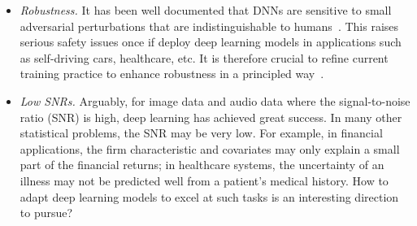 \begin{itemize}
\item{\emph{Robustness.} It has been well documented that DNNs are sensitive to small adversarial perturbations that are indistinguishable to humans~\citep{szegedy2013intriguing}. This raises serious safety issues once if deploy deep learning models in applications such as self-driving cars, healthcare, etc. It is therefore crucial  to refine current training practice to enhance robustness in a principled way~\citep{singh2018hierarchical}.  %
}


\item{\emph{Low SNRs.} Arguably, for image data and audio data where the signal-to-noise ratio (SNR) is high, deep learning has achieved great success. In many other statistical problems, the SNR may be very low. For example, in financial applications, the firm characteristic and covariates may only explain a small part of the financial returns; in healthcare systems, the uncertainty of an illness may not be predicted well from a patient's medical history. How to adapt deep learning models to excel at such tasks is an interesting direction to pursue?

}


\end{itemize}



